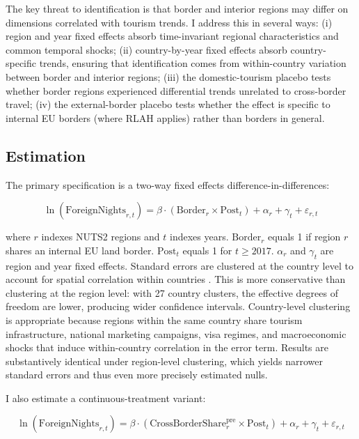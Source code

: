 \documentclass[12pt]{article}
\begin{document}
The key threat to identification is that border and interior regions may differ on dimensions correlated with tourism trends. I address this in several ways: (i) region and year fixed effects absorb time-invariant regional characteristics and common temporal shocks; (ii) country-by-year fixed effects absorb country-specific trends, ensuring that identification comes from within-country variation between border and interior regions; (iii) the domestic-tourism placebo tests whether border regions experienced differential trends unrelated to cross-border travel; (iv) the external-border placebo tests whether the effect is specific to internal EU borders (where RLAH applies) rather than borders in general.

\subsection{Estimation}

The primary specification is a two-way fixed effects difference-in-differences:

\begin{equation}
\ln(\text{ForeignNights}_{r,t}) = \beta \cdot (\text{Border}_r \times \text{Post}_t) + \alpha_r + \gamma_t + \varepsilon_{r,t}
\label{eq:main}
\end{equation}

\noindent where $r$ indexes NUTS2 regions and $t$ indexes years. $\text{Border}_r$ equals 1 if region $r$ shares an internal EU land border. $\text{Post}_t$ equals 1 for $t \geq 2017$. $\alpha_r$ and $\gamma_t$ are region and year fixed effects. Standard errors are clustered at the country level to account for spatial correlation within countries \citep{bertrand2004much}. This is more conservative than clustering at the region level: with 27 country clusters, the effective degrees of freedom are lower, producing wider confidence intervals. Country-level clustering is appropriate because regions within the same country share tourism infrastructure, national marketing campaigns, visa regimes, and macroeconomic shocks that induce within-country correlation in the error term. Results are substantively identical under region-level clustering, which yields narrower standard errors and thus even more precisely estimated nulls.

I also estimate a continuous-treatment variant:

\begin{equation}
\ln(\text{ForeignNights}_{r,t}) = \beta \cdot (\text{CrossBorderShare}_{r}^{\text{pre}} \times \text{Post}_t) + \alpha_r + \gamma_t + \varepsilon_{r,t}
\label{eq:continuous}
\end{equation}
\end{document}
